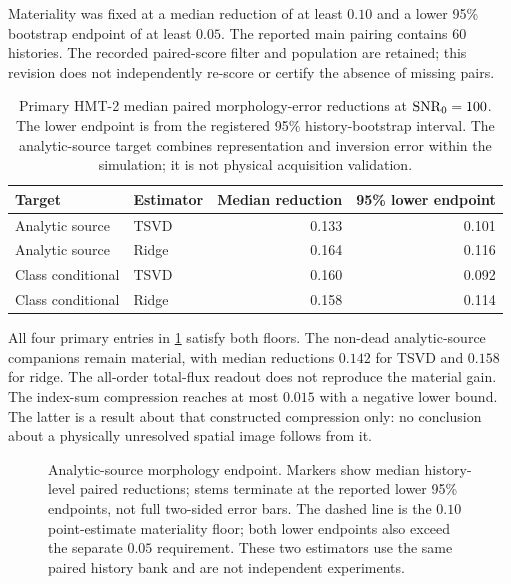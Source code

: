 Materiality was fixed at a median reduction of at least $0.10$ and a lower 95\% bootstrap endpoint of at least $0.05$. The reported main pairing contains 60 histories. The recorded paired-score filter and population are retained; this revision does not independently re-score or certify the absence of missing pairs.

\begin{table}[htbp]
\centering\small
\caption{Primary HMT-2 median paired morphology-error reductions at $\mathrm{SNR}_0=100$. The lower endpoint is from the registered 95\% history-bootstrap interval. The analytic-source target combines representation and inversion error within the simulation; it is not physical acquisition validation.}
\label{tab:hmt2}
\begin{tabular}{l l r r}
\toprule
Target&Estimator&Median reduction&95\% lower endpoint\\
\midrule
Analytic source&TSVD&0.133&0.101\\
Analytic source&Ridge&0.164&0.116\\
Class conditional&TSVD&0.160&0.092\\
Class conditional&Ridge&0.158&0.114\\
\bottomrule
\end{tabular}
\end{table}

All four primary entries in \cref{tab:hmt2} satisfy both floors. The non-dead analytic-source companions remain material, with median reductions $0.142$ for TSVD and $0.158$ for ridge. The all-order total-flux readout does not reproduce the material gain. The index-sum compression reaches at most $0.015$ with a negative lower bound. The latter is a result about that constructed compression only: no conclusion about a physically unresolved spatial image follows from it.

\begin{figure}[htbp]
\centering
{}
\caption{Analytic-source morphology endpoint. Markers show median history-level paired reductions; stems terminate at the reported lower 95\% endpoints, not full two-sided error bars. The dashed line is the $0.10$ point-estimate materiality floor; both lower endpoints also exceed the separate $0.05$ requirement. These two estimators use the same paired history bank and are not independent experiments.}
\label{fig:morphology}
\end{figure}

